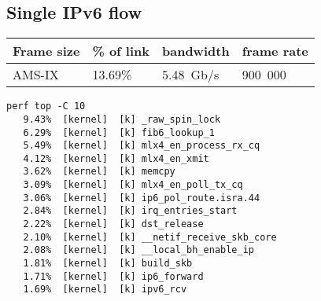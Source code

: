 
\subsection{Single IPv6 flow}
\begin{tabular}{ | l | l | l | l | }
\hline
Frame size & \% of link & bandwidth & frame rate \\
\hline
AMS-IX & 13.69\% &  5.48~Gb/s & 900~000 \\
\hline
\end{tabular}

\begin{lstlisting}
perf top -C 10
   9.43%  [kernel]  [k] _raw_spin_lock
   6.29%  [kernel]  [k] fib6_lookup_1
   5.49%  [kernel]  [k] mlx4_en_process_rx_cq
   4.12%  [kernel]  [k] mlx4_en_xmit
   3.62%  [kernel]  [k] memcpy
   3.09%  [kernel]  [k] mlx4_en_poll_tx_cq
   3.06%  [kernel]  [k] ip6_pol_route.isra.44
   2.84%  [kernel]  [k] irq_entries_start
   2.22%  [kernel]  [k] dst_release
   2.10%  [kernel]  [k] __netif_receive_skb_core
   2.08%  [kernel]  [k] __local_bh_enable_ip
   1.81%  [kernel]  [k] build_skb
   1.71%  [kernel]  [k] ip6_forward
   1.69%  [kernel]  [k] ipv6_rcv
\end{lstlisting}
